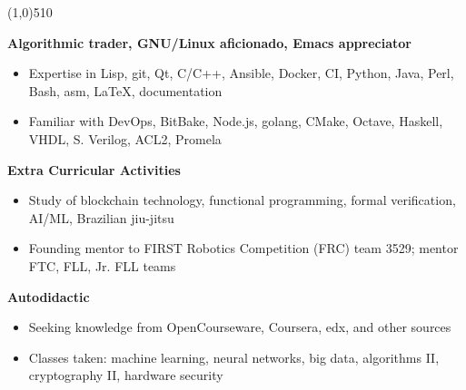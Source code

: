 \documentclass{report}
\newcommand{\cut}{\begin{center} \line(1,0){510} \end{center}}
\begin{document}
\cut{}

\textbf{Algorithmic trader, GNU/Linux aficionado, Emacs appreciator}
\begin{itemize}[label=$\circ$]
\item Expertise in Lisp, git, Qt, C/C++, Ansible, Docker, CI, Python, Java, Perl, Bash, asm,
  \LaTeX{}, documentation
\item Familiar with DevOps, BitBake, Node.js, golang, CMake, Octave, Haskell, VHDL, S. Verilog, ACL2, Promela
\end{itemize}

\textbf{Extra Curricular Activities}
\begin{itemize}[label=$\circ$]
\item Study of blockchain technology, functional programming, formal verification, AI/ML, Brazilian jiu-jitsu
\item Founding mentor to FIRST Robotics Competition (FRC) team 3529; mentor FTC,
  FLL, Jr. FLL teams
\end{itemize}

\textbf{Autodidactic}
\begin{itemize}[label=$\circ$]
\item Seeking knowledge from OpenCourseware, Coursera, edx, and other sources
\item Classes taken: machine learning, neural networks, big data, algorithms II,
  cryptography II, hardware security
\end{itemize}


\end{document}
